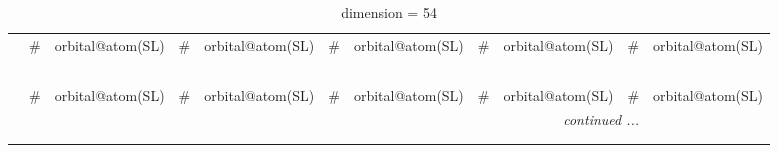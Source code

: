 \documentclass[fleqn,10pt,landscape]{jsarticle}
\begin{document}
\renewcommand{\arraystretch}{1.6}
\begin{longtable}[l]{c|cl|cl|cl|cl|cl}
\captionsetup{justification=raggedright, singlelinecheck=off}
\caption{dimension = 54}
 \\
 \hline \hline
 & \# & orbital@atom(SL) & \# & orbital@atom(SL) & \# & orbital@atom(SL) & \# & orbital@atom(SL) & \# & orbital@atom(SL) \\ \hline \endfirsthead

\multicolumn{10}{l}{\tablename\ \thetable{}} \\
 \hline \hline
 & \# & orbital@atom(SL) & \# & orbital@atom(SL) & \# & orbital@atom(SL) & \# & orbital@atom(SL) & \# & orbital@atom(SL) \\ \hline \endhead

 \hline \hline
\multicolumn{10}{r}{\footnotesize\it continued ...} \\ \endfoot

 \hline \hline
\multicolumn{10}{r}{} \\ \endlastfoot


\end{longtable}
\end{document}
